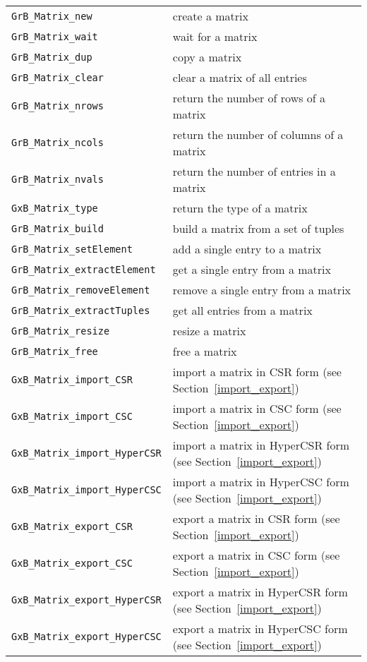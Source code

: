 \documentclass[12pt]{article}
\begin{document}
\vspace{0.2in}
{\footnotesize
\begin{tabular}{ll}
\hline
\verb'GrB_Matrix_new'           & create a matrix \\
\verb'GrB_Matrix_wait'          & wait for a matrix \\
\verb'GrB_Matrix_dup'           & copy a matrix \\
\verb'GrB_Matrix_clear'         & clear a matrix of all entries \\
\verb'GrB_Matrix_nrows'         & return the number of rows of a matrix \\
\verb'GrB_Matrix_ncols'         & return the number of columns of a matrix \\
\verb'GrB_Matrix_nvals'         & return the number of entries in a matrix \\
\verb'GxB_Matrix_type'          & return the type of a matrix \\
\verb'GrB_Matrix_build'         & build a matrix from a set of tuples \\
\verb'GrB_Matrix_setElement'    & add a single entry to a matrix \\
\verb'GrB_Matrix_extractElement'& get a single entry from a matrix \\
\verb'GrB_Matrix_removeElement' & remove a single entry from a matrix \\
\verb'GrB_Matrix_extractTuples' & get all entries from a matrix \\
\verb'GrB_Matrix_resize'        & resize a matrix \\
\verb'GrB_Matrix_free'          & free a matrix \\
\hline
\verb'GxB_Matrix_import_CSR'            & import a matrix in CSR form
                                          (see Section~\ref{import_export})\\
\verb'GxB_Matrix_import_CSC'            & import a matrix in CSC form
                                          (see Section~\ref{import_export})\\
\verb'GxB_Matrix_import_HyperCSR'       & import a matrix in HyperCSR form
                                          (see Section~\ref{import_export})\\
\verb'GxB_Matrix_import_HyperCSC'       & import a matrix in HyperCSC form
                                          (see Section~\ref{import_export})\\
\verb'GxB_Matrix_export_CSR'            & export a matrix in CSR form
                                          (see Section~\ref{import_export})\\
\verb'GxB_Matrix_export_CSC'            & export a matrix in CSC form
                                          (see Section~\ref{import_export})\\
\verb'GxB_Matrix_export_HyperCSR'       & export a matrix in HyperCSR form
                                          (see Section~\ref{import_export})\\
\verb'GxB_Matrix_export_HyperCSC'       & export a matrix in HyperCSC form
                                          (see Section~\ref{import_export})\\
\hline
\end{tabular}
}
\end{document}
